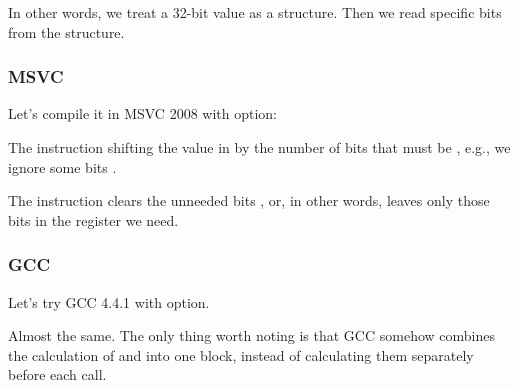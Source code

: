In other words, we treat a 32-bit \Tint value as a structure.
Then we read specific bits from the structure.

\subsubsection{MSVC}

Let's compile it in MSVC 2008 with \Ox option:




The  instruction shifting the value in \EAX by the number of bits that must be
, e.g., we ignore some bits .


The \AND instruction clears the unneeded bits , or, in other words, 
leaves only those bits in the \EAX register we need.



\subsubsection{GCC}

Let's try GCC 4.4.1 with \Othree option.



Almost the same.
The only thing worth noting is that GCC somehow combines the calculation of
 and  into one block,
instead of calculating them separately before each \printf call.
